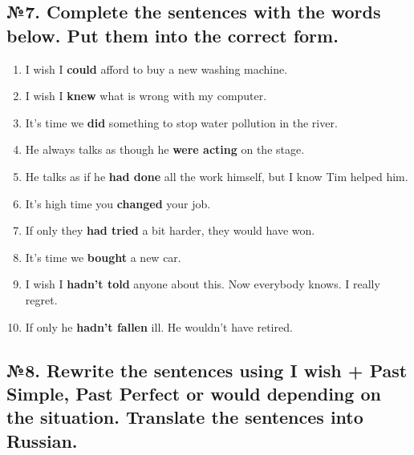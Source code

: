 \subsection*{№7. Complete the sentences with the words below. Put them into the correct form.}

\begin{enumerate}
      \item I wish I \textbf{could} afford to buy a new washing machine.
      \item I wish I \textbf{knew} what is wrong with my computer.
      \item It's time we \textbf{did} something to stop water pollution in the river.
      \item He always talks as though he \textbf{were acting} on the stage.
      \item He talks as if he \textbf{had done} all the work himself, but I know Tim helped him.
      \item It's high time you \textbf{changed} your job.
      \item If only they \textbf{had tried} a bit harder, they would have won.
      \item It’s time we \textbf{bought} a new car.
      \item I wish I \textbf{hadn't told} anyone about this. Now everybody knows. I really regret.
      \item If only he \textbf{hadn't fallen} ill. He wouldn’t have retired.
\end{enumerate}

\subsection*{№8. Rewrite the sentences using I wish + Past Simple, Past Perfect or would depending on the situation. Translate the sentences into Russian.}

